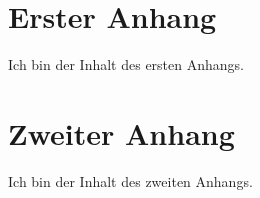\begin{appendices}
    \clearpage
    \section{Erster Anhang}
    \label{app:firstappendix}

    Ich bin der Inhalt des ersten Anhangs.

    \section{Zweiter Anhang}
    \label{app:secondappendix}

    Ich bin der Inhalt des zweiten Anhangs.

\end{appendices}